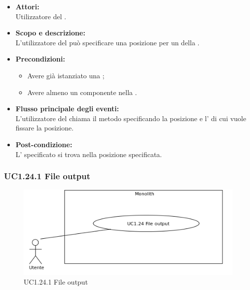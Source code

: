 \begin{itemize}
	\item \textbf{Attori:}
	\\Utilizzatore del .
	\item \textbf{Scopo e descrizione:} 
	\\L'utilizzatore del  può specificare una posizione per un  della .
	\item \textbf{Precondizioni:}
	\begin{itemize}
		\item Avere già istanziato una ;
		\item Avere almeno un componente nella .
	\end{itemize}
	\item \textbf{Flusso principale degli eventi:}
	\\L'utilizzatore del  chiama il metodo specificando la posizione e l' di cui vuole fissare la posizione.
	\item \textbf{Post-condizione:}
	\\L' specificato si trova nella posizione specificata.
\end{itemize}

\subsubsection{UC1.24.1 File output} \label{UC1.24.1}

\begin{figure}[H]
	\centering
	\includegraphics[width=15cm]{../../documenti/AnalisiDeiRequisiti/Diagrammi_img/uc1_24.png}
	\caption{UC1.24.1 File output}
\end{figure}


